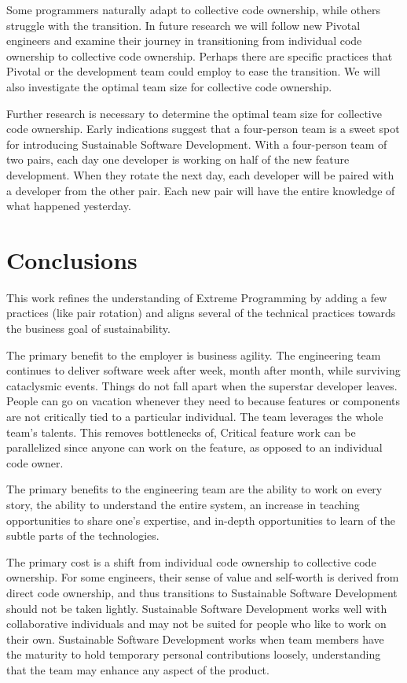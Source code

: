 \begin{table}[]
Some programmers naturally adapt to collective code ownership, while others struggle with the transition. In future research we will follow new Pivotal engineers and examine their journey in transitioning from individual code ownership to collective code ownership. Perhaps there are 
specific practices that Pivotal or the development team could employ to ease the transition. We will also investigate the optimal team size for collective code ownership. 

Further research is necessary to determine the optimal team size for collective code ownership. Early indications suggest that a four-person team is a sweet spot for introducing Sustainable Software Development. With a four-person team of two pairs, each day one developer is working on half of the new feature development. When they rotate the next day, each developer will be paired with a developer from the other pair. Each new pair will have the entire knowledge of what happened yesterday. 


\section{Conclusions}
This work refines the understanding of Extreme Programming by adding a few practices (like pair rotation) and aligns several of the technical practices towards the business goal of sustainability.

The primary benefit to the employer is business agility. The engineering team continues to deliver software week after week, month after month, while surviving cataclysmic events. Things do not fall apart when the superstar developer leaves. People can go on vacation whenever they need to because features or components are not critically tied to a particular individual. The team leverages the whole team's talents. This removes bottlenecks of,  Critical feature work can be parallelized since anyone can work on the feature, as opposed to an individual code owner. 

The primary benefits to the engineering team are the ability to work on every story, the ability to understand the entire system, an increase in teaching opportunities to share one's expertise, and in-depth opportunities to learn of the subtle parts of the technologies. 

The primary cost is a shift from individual code ownership to collective code ownership. For some engineers, their sense of value and self-worth is derived from direct code ownership, and thus transitions to Sustainable Software Development should not be taken lightly. Sustainable Software Development works well with collaborative individuals and may not be suited for people who like to work on their own. Sustainable Software Development works when team members have the maturity to hold temporary personal contributions loosely, understanding that the team may enhance any aspect of the product.


\end{table}

